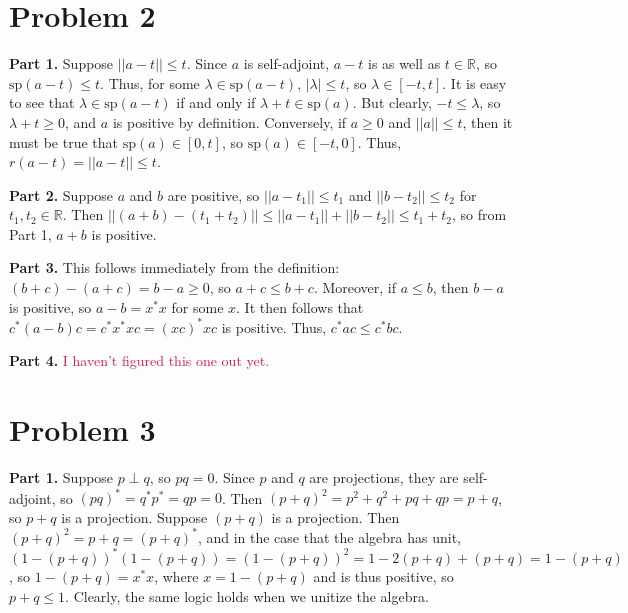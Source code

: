 \documentclass[aps,pra,showpacs,notitlepage,onecolumn,superscriptaddress,nofootinbib]{revtex4-1}
\newcommand{\pop}[1]{\textcolor{crimson}{#1}}
\theoremstyle{definition}
\begin{document}
\section{Problem 2}

\noindent \textbf{Part 1.} Suppose $||a - t|| \leq t$. Since $a$ is self-adjoint, $a - t$ is as well as $t \in \mathbb{R}$, so $\text{sp}(a - t) \leq t$. Thus, for some $\lambda \in \text{sp}(a - t)$, $|\lambda| \leq t$, so $\lambda \in [-t, t]$.
It is easy to see that $\lambda \in \text{sp}(a - t)$ if and only if $\lambda + t \in \text{sp}(a)$. But clearly, $-t \leq \lambda$, so $\lambda + t \geq 0$, and $a$ is positive by definition. Conversely, if $a \geq 0$ and $||a|| \leq t$, then it
must be true that $\text{sp}(a) \in [0, t]$, so $\text{sp}(a) \in [-t, 0]$. Thus, $r(a - t) = ||a - t|| \leq t$.
\newline

\noindent \textbf{Part 2.} Suppose $a$ and $b$ are positive, so $||a - t_1|| \leq t_1$ and $||b - t_2|| \leq t_2$ for $t_1, t_2 \in \mathbb{R}$. Then $||(a + b) - (t_1 + t_2)|| \leq ||a - t_1|| + ||b - t_2|| \leq t_1 + t_2$,
so from Part 1, $a + b$ is positive.
\newline

\noindent \textbf{Part 3.} This follows immediately from the definition: $(b + c) - (a + c) = b - a \geq 0$, so $a + c \leq b + c$. Moreover, if $a \leq b$, then $b - a$ is positive, so $a - b = x^{*} x$ for some $x$. It then follows that
$c^{*} (a - b) c = c^{*} x^{*} x c = (x c)^{*} xc$ is positive. Thus, $c^{*} a c \leq c^{*} b c$.
\newline

\noindent \textbf{Part 4.} \pop{I haven't figured this one out yet.}

\section{Problem 3}

\noindent \textbf{Part 1.} Suppose $p \perp q$, so $pq = 0$. Since $p$ and $q$ are projections, they are self-adjoint, so $(pq)^{*} = q^{*} p^{*} = qp = 0$. Then $(p + q)^2 = p^2 + q^2 + pq + qp = p + q$,
so $p + q$ is a projection. Suppose $(p + q)$ is a projection. Then $(p + q)^2 = p + q = (p + q)^{*}$, and in the case that the algebra has unit, $(1 - (p + q))^{*} (1 - (p + q)) = (1 - (p + q))^2 = 1 - 2(p + q) + (p + q) = 1 - (p + q)$,
so $1 - (p + q) = x^{*} x$, where $x = 1 - (p + q)$ and is thus positive, so $p + q \leq 1$. Clearly, the same logic holds when we unitize the algebra.
\end{document}

